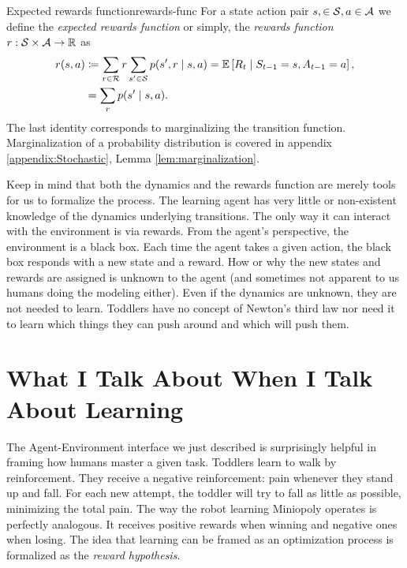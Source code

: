 \begin{dfn}{Expected rewards function}{rewards-func}
	For a state action pair $s, \in \mathcal{S}, a \in \mathcal{A}$ we define the
	\emph{expected rewards function} or simply, the \emph{rewards function} $r:
	\mathcal{S} \times \mathcal{A} \to \mathbb{R}$ as
	\begin{align*}
		r(s, a) &\coloneqq \sum_{r \in \mathcal{R}} r \sum_{s' \in \mathcal{S}} p(s', r \mid s, a) = \mathbb{E} \left[ R_t \mid S_{t-1} = s, A_{t-1} = a \right], \\
		&= \sum_r p(s' \mid s, a).
	\end{align*}
	The last identity corresponds to marginalizing the transition function.
	Marginalization of a probability distribution is covered in appendix
	\ref{appendix:Stochastic}, Lemma \ref{lem:marginalization}.
\end{dfn}

Keep in mind that both the dynamics and the rewards function are merely tools
for us to formalize the process. The learning agent has very little or
non-existent knowledge of the dynamics underlying transitions. The only way it
can interact with the environment is via rewards. From the agent's perspective,
the environment is a black box. Each time the agent takes a given action, the
black box responds with a new state and a reward. How or why the new states and
rewards are assigned is unknown to the agent (and sometimes not apparent to us
humans doing the modeling either). Even if the dynamics are unknown, they are
not needed to learn.  Toddlers have no concept of Newton's third law nor need it
to learn which things they can push around and which will push them.

\section{What I Talk About When I Talk About Learning}

The Agent-Environment
interface we just described is surprisingly helpful in framing how humans master
a given task. Toddlers learn to walk by reinforcement.  They receive a negative
reinforcement: pain whenever they stand up and fall.  For each new attempt, the
toddler will try to fall as little as possible, minimizing the total pain. The
way the robot learning Miniopoly operates is perfectly analogous. It receives
positive rewards when winning and negative ones when losing.  The idea that
learning can be framed as an optimization process is formalized as the
\emph{reward hypothesis}.

